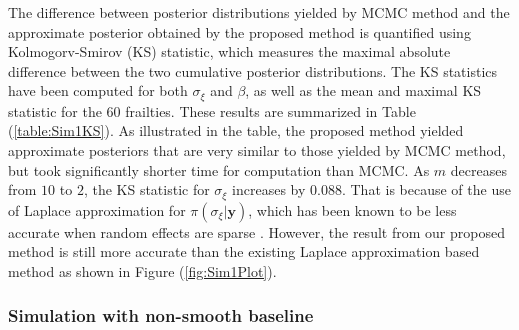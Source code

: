 \documentclass[ba]{imsart}
\begin{document}
The difference between posterior distributions yielded by MCMC method and the approximate posterior obtained by the proposed method is quantified using Kolmogorv-Smirov (KS) statistic, which measures the maximal absolute difference between the two cumulative posterior distributions. The KS statistics have been computed for both $\sigma_\xi$ and $\beta$, as well as the mean and maximal KS statistic for the $60$ frailties. These results are summarized in Table (\ref{table:Sim1KS}).  As illustrated in the table, the proposed method yielded approximate posteriors that are very similar to those yielded by MCMC method, but took significantly shorter time for computation than MCMC. As $m$ decreases from $10$ to $2$, the KS statistic for $\sigma_\xi$ increases by 0.088. That is because of the use of Laplace approximation for $\pi(\sigma_\xi|\boldsymbol{y})$, which has been known to be less accurate when random effects are sparse \citep{Ogden2013ASR}. However, the result from our proposed method is still more accurate than the existing Laplace approximation based method as shown in Figure (\ref{fig:Sim1Plot}).


\begin{table}[h]
  \begin{center}
  \end{center}
  \caption{KS statistic for each parameter in the first simulation study in section \ref{subsubsec:sim1}, to compare the proposed approach with MCMC.}
  \label{table:Sim1KS}
  \end{table}



\subsubsection{Simulation with non-smooth baseline}\label{subsubsec:sim2}
\end{document}
